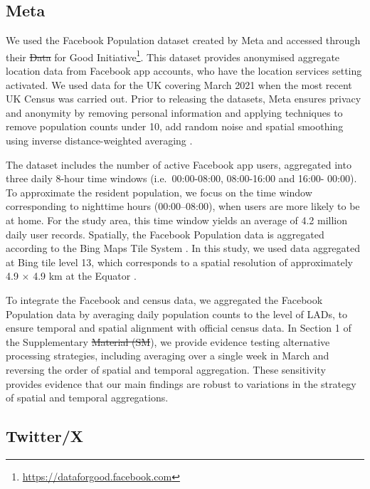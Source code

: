 \documentclass[]{rsos}%
\providecommand{\DIFadd}[1]{{\protect\color{blue}\uwave{#1}}} %
\providecommand{\DIFdel}[1]{{\protect\color{red}\sout{#1}}}                      %
\providecommand{\DIFaddbegin}{} %
\providecommand{\DIFaddend}{} %
\providecommand{\DIFdelbegin}{} %
\providecommand{\DIFdelend}{} %
\begin{document}
\subsection{Meta}\label{meta}

We used the Facebook Population dataset created by Meta and accessed
through their \DIFdelbegin \DIFdel{Data }\DIFdelend \DIFaddbegin \DIFadd{AI }\DIFaddend for Good Initiative\footnote{\url{https://dataforgood.facebook.com}}. This dataset provides
anonymised aggregate location data from Facebook app accounts, who have
the location services setting activated. We used data for the UK
covering March 2021 when the most recent UK Census was carried out.
Prior to releasing the datasets, Meta ensures privacy and anonymity by
removing personal information and applying techniques to remove
population counts under 10, add random noise and spatial smoothing using
inverse distance-weighted averaging \citep{maas2019}.

The dataset includes the number of active Facebook app users, aggregated
into three daily 8-hour time windows (i.e.~00:00-08:00, 08:00-16:00 and
16:00- 00:00). To approximate the resident population, we focus on the
time window corresponding to nighttime hours (00:00--08:00), when users
are more likely to be at home. For the study area, this time window
yields an average of 4.2 million daily user records. Spatially, the
Facebook Population data is aggregated according to the Bing Maps Tile
System \citep{bingmaps_tile_system}. In this study, we used data aggregated
at Bing tile level 13, which corresponds to a spatial resolution of
approximately 4.9 \(\times\) 4.9 km at the Equator \citep{maas2019}.

To integrate the Facebook and census data, we aggregated the Facebook
Population data by averaging daily population counts to the level of
LADs, to ensure temporal and spatial alignment with official census
data. In Section 1 of the Supplementary \DIFdelbegin \DIFdel{Material (SM}\DIFdelend \DIFaddbegin \DIFadd{Information (SI}\DIFaddend ), we provide
evidence testing alternative processing strategies, including averaging
over a single week in March and reversing the order of spatial and
temporal aggregation. These sensitivity provides evidence that our main
findings are robust to variations in the strategy of spatial and
temporal aggregations.

\subsection{Twitter/X}\label{twitterx}
\end{document}
